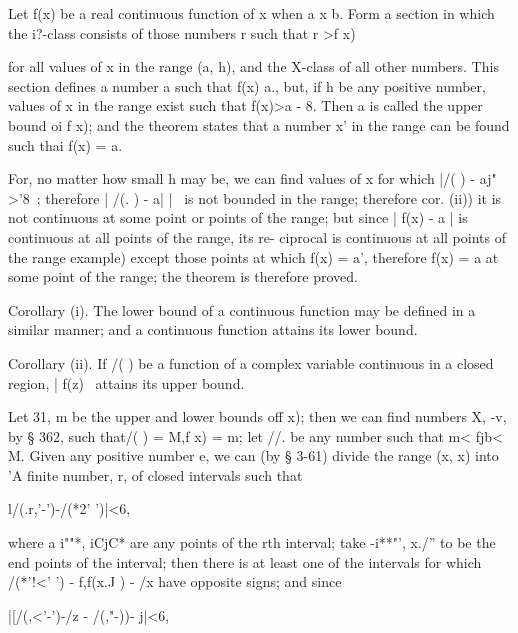
Let f(x) be a real continuous function of x when a x b. Form a section
in which the i?-class consists of those numbers r such that r >f x)

%
%

for all values of x in the range (a, h), and the X-class of all other
numbers. This section defines a number a such that f(x) a., but, if h
be any positive number, values of x in the range exist such that
f(x)>a - 8. Then a is called the upper bound oi f x); and the theorem
states that a number x' in the range can be found such thai f(x) = a.

For, no matter how small h may be, we can find values of x for which
|/( ) - aj" >'8~; therefore | /(. ) - a| |~ is not bounded in the
range; therefore  cor. (ii)) it is not continuous at some point
or points of the range; but since | f(x) - a | is continuous at all
points of the range, its re- ciprocal is continuous at all points of
the range  example) except those points at which f(x) = a',
therefore f(x) = a at some point of the range; the theorem is
therefore proved.

Corollary (i). The lower bound of a continuous function may be defined
in a similar manner; and a continuous function attains its lower
bound.

Corollary (ii). If /( ) be a function of a complex variable continuous
in a closed region, | f(z) \ attains its upper bound.


Let 31, m be the upper and lower bounds off x); then we can find
numbers X, -v, by § 362, such that/( ) = M,f x) = m; let //. be any
number such that m< fjb< M. Given any positive number e, we can (by §
3-61) divide the range (x, x) into 'A finite number, r, of closed
intervals such that

l/(.r,'-')-/(*2' ')|<6,

where a i""*, iCjC* are any points of the rth interval; take -i**"',
x./'' to be the end points of the interval; then there is at least
one of the intervals for which /(*'!<' ') - f,f(x.J ) - /x have
opposite signs; and since

|[/(,<'-')-/z - /(,"-))- j|<6,

